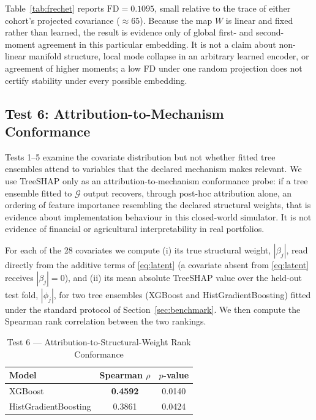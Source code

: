 \documentclass[journal]{IEEEtran}
\newcommand{\dgp}{\ensuremath{\mathcal{G}}}
\begin{document}
Table~\ref{tab:frechet} reports $\text{FD}=0.1095$, small relative to the trace of either cohort's projected covariance ($\approx65$). Because the map $W$ is linear and fixed rather than learned, the result is evidence only of global first- and second-moment agreement in this particular embedding. It is not a claim about non-linear manifold structure, local mode collapse in an arbitrary learned encoder, or agreement of higher moments; a low FD under one random projection does not certify stability under every possible embedding.

\subsection{Test 6: Attribution-to-Mechanism Conformance}
\label{sec:shaptest}
Tests 1--5 examine the covariate distribution but not whether fitted tree ensembles attend to variables that the declared mechanism makes relevant. We use TreeSHAP \cite{lundberg2017shap,lundberg2020treeshap} only as an attribution-to-mechanism conformance probe: if a tree ensemble fitted to $\dgp$ output recovers, through post-hoc attribution alone, an ordering of feature importance resembling the declared structural weights, that is evidence about implementation behaviour in this closed-world simulator. It is not evidence of financial or agricultural interpretability in real portfolios.

For each of the 28 covariates we compute (i) its true structural weight, $|\beta_j|$, read directly from the additive terms of \eqref{eq:latent} (a covariate absent from \eqref{eq:latent} receives $|\beta_j|=0$), and (ii) its mean absolute TreeSHAP value over the held-out test fold, $\overline{|\phi_j|}$, for two tree ensembles (XGBoost and HistGradientBoosting) fitted under the standard protocol of Section~\ref{sec:benchmark}. We then compute the Spearman rank correlation between the two rankings.

\begin{table}[!t]
\caption{Test 6 --- Attribution-to-Structural-Weight Rank Conformance}
\label{tab:shap}
\centering
\footnotesize
\begin{tabular}{@{}lcc@{}}
\toprule
Model & Spearman $\rho$ & $p$-value \\
\midrule
XGBoost & \textbf{0.4592} & 0.0140 \\
HistGradientBoosting & 0.3861 & 0.0424 \\
\bottomrule
\end{tabular}
\end{table}
\end{document}
